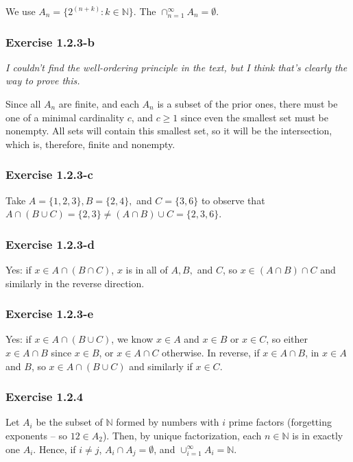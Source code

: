 \documentclass{article}
\newcommand{\N}{\mathbb{N}}
\begin{document}
We use $A_n = \{ 2 ^ {(n + k)} : k \in \N \}$.
The $\cap_{n=1}^{\infty} A_n = \emptyset$.

\subsubsection*{Exercise 1.2.3-b}

\textit{I couldn't find the well-ordering principle in the text, but I think that's clearly the way to prove this.}

Since all $A_n$ are finite, and each $A_n$ is a subset of the prior ones, there must be one of a minimal cardinality $c$,
and $c \geq 1$ since even the smallest set must be nonempty.
All sets will contain this smallest set, so it will be the intersection, which is, therefore, finite and nonempty.

\subsubsection*{Exercise 1.2.3-c}

Take $A = \{1, 2, 3\}, B = \{2, 4\},$ and $C = \{3, 6\}$ to observe that $A \cap (B \cup C) = \{2, 3\} \neq (A \cap B) \cup C = \{2, 3, 6\}$.

\subsubsection*{Exercise 1.2.3-d}

Yes: if $x \in A \cap (B \cap C)$, $x$ is in all of $A, B,$ and $C$, so $x \in (A \cap B) \cap C$ and similarly in the reverse direction.

\subsubsection*{Exercise 1.2.3-e}

Yes: if $x \in A \cap (B \cup C)$, we know $x \in A$ and $x \in B$ or $x \in C$, so either $x \in A \cap B$ since $x \in B$, or $x \in A \cap C$ otherwise.
In reverse, if $x \in A \cap B$, in $x \in A$ and $B$, so $x \in A \cap (B \cup C)$ and similarly if $x \in C$.

\subsubsection*{Exercise 1.2.4}

Let $A_i$ be the subset of $\N$ formed by numbers with $i$ prime factors (forgetting exponents -- so $12 \in A_2$).
Then, by unique factorization, each $n \in \N$ is in exactly one $A_i$. Hence, if $i \neq j$, $A_i \cap A_j = \emptyset$,
and $\cup_{i=1}^{\infty} A_i = \N$.
\end{document}
